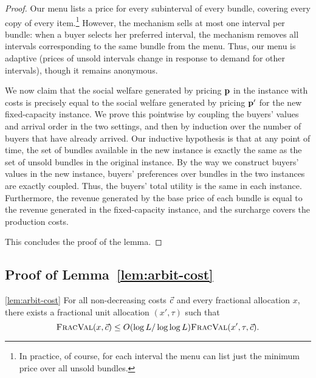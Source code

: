\begin{proof}
    Our menu lists a price for every subinterval of every bundle, covering
    every copy of every item.\footnote{In practice, of course, for each
    interval the menu can list just the minimum price over all unsold bundles.}
    However, the mechanism sells at most one interval per bundle: when a buyer
    selects her preferred interval, the mechanism removes all intervals
    corresponding to the same bundle from the menu. Thus, our menu is adaptive
    (prices of unsold intervals change in response to demand for other
    intervals), though it remains anonymous.

    We now claim that the social welfare generated by pricing $\mathbf{p}$ in the
    instance with costs is precisely equal to the social welfare generated by
    pricing $\mathbf{p}'$ for the new fixed-capacity instance. We prove this
    pointwise by coupling the buyers' values and arrival order in the two
    settings, and then by induction over the number of buyers that have already
    arrived. Our inductive hypothesis is that at any point of time, the set of
    bundles available in the new instance is exactly the same as the set of
    unsold bundles in the original instance.  By the way we
    construct buyers' values in the new instance, buyers' preferences over
    bundles in the two instances are exactly coupled. Thus, the buyers' total
    utility is the same in each instance. Furthermore, the revenue generated by
    the base price of each bundle is equal to the revenue generated in the
    fixed-capacity instance, and the surcharge covers the production costs.

    This concludes the proof of the lemma.
\end{proof}

\subsection{Proof of Lemma~\ref{lem:arbit-cost}}

\begin{numberedlemma}{\ref{lem:arbit-cost}}
    For all non-decreasing costs $\vec{c}$ and every fractional allocation $x$,
    there exists a fractional unit allocation $(x',\tau)$ such that
    \[
        {\normalfont\textsc{FracVal}}(x,\vec{c})\le  O(\log L/\log\log L){\normalfont\textsc{FracVal}}(x',\tau,\vec{c}).
    \]
\end{numberedlemma}


